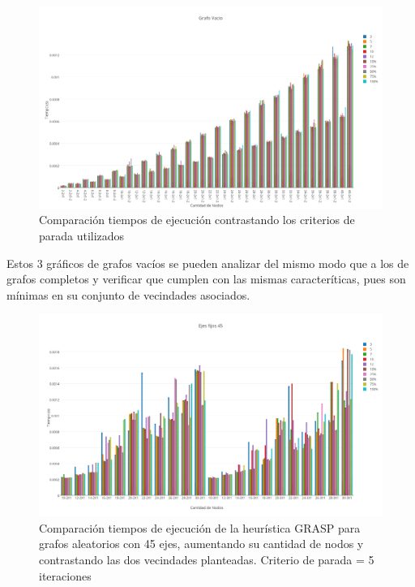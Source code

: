   \begin{figure}[h!]
   \begin{center}
 	\includegraphics[scale=0.35]{imagenes/grasp/vacio-5vs10.png}
 	\caption{Comparaci\'on tiempos de ejecuci\'on contrastando los criterios de parada utilizados}
   \end{center}
 \end{figure}
\newpage

Estos 3 gr\'aficos de grafos vac\'ios se pueden analizar del mismo modo que a los de grafos completos y verificar que cumplen con las mismas caracter\'iticas, pues son m\'inimas en su conjunto de vecindades asociados.

  \begin{figure}[h!]
   \begin{center}
 	\includegraphics[scale=0.35]{imagenes/grasp/45ejes-5repes.png}
 	\caption{Comparaci\'on tiempos de ejecuci\'on de la heur\'istica GRASP para grafos aleatorios con 45 ejes, aumentando su cantidad de nodos y contrastando las dos vecindades planteadas. Criterio de parada = 5 iteraciones}
   \end{center}
 \end{figure}
\newpage

